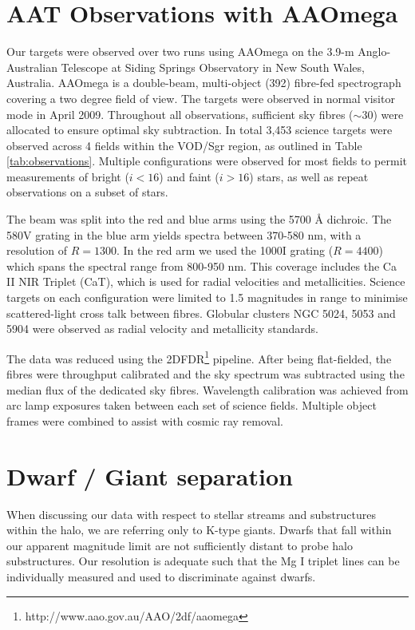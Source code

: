 \section{AAT Observations with AAOmega}
\label{sec:ch1-observations}

Our targets were observed over two runs using AAOmega on the 3.9-m Anglo-Australian Telescope at Siding Springs Observatory in New South Wales, Australia. AAOmega is a double-beam, multi-object (392) fibre-fed spectrograph covering a two degree field of view. The targets were observed in normal visitor mode in April 2009. Throughout all observations, sufficient sky fibres ($\sim30$) were allocated to ensure optimal sky subtraction. In total 3,453 science targets were observed across 4 fields within the VOD/Sgr region, as outlined in Table \ref{tab:observations}. Multiple configurations were observed for most fields to permit measurements of bright ($i < 16$) and faint ($i > 16$) stars, as well as repeat observations on a subset of stars.

The beam was split into the red and blue arms using the 5700 \AA{} dichroic. The 580V grating in the blue arm yields spectra between 370-580 nm, with a resolution of $R = 1300$. In the red arm we used the 1000I grating ($R = 4400$) which spans the spectral range from 800-950 nm. This coverage includes the Ca II NIR Triplet (CaT), which is used for radial velocities and metallicities. Science targets on each configuration were limited to 1.5 magnitudes in range to minimise scattered-light cross talk between fibres. Globular clusters NGC 5024, 5053 and 5904 were observed as radial velocity and metallicity standards.

The data was reduced using the 2\textsc{DFDR}\footnote{http://www.aao.gov.au/AAO/2df/aaomega} pipeline. After being flat-fielded, the fibres were throughput calibrated and the sky spectrum was subtracted using the median flux of the dedicated sky fibres. Wavelength calibration was achieved from arc lamp exposures taken between each set of science fields. Multiple object frames were combined to assist with cosmic ray removal. 


\section{Dwarf / Giant separation}
\label{sec:ch1-dwarf-giant-separation}

When discussing our data with respect to stellar streams and substructures within the halo, we are referring only to K-type giants.  Dwarfs that fall within our apparent magnitude limit are not sufficiently distant to probe halo substructures. Our resolution is adequate such that the Mg I triplet lines can be individually measured and used to discriminate against dwarfs. 	

